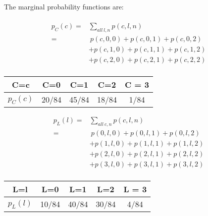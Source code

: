 \documentclass{article}
\begin{document}
The marginal probability functions are:\\
\\
\begin{equation} \label{eq1}
\begin{split}
p_C(c) = & \sum_{all\ l, n} p(c, l, n) \\
 = &\ p(c, 0, 0) + p(c,  0, 1) + p(c, 0, 2) \\
& + p(c, 1, 0) + p(c, 1, 1) + p(c, 1, 2) \\
& + p(c,  2, 0) + p(c, 2, 1) + p(c, 2, 2) \\
\end{split}
\end{equation}
\begin{center}
 \begin{tabular}{|| c c c c c ||} 
 \hline
C=c & C=0 & C=1 & C=2 & C = 3\\ [0.5ex] 
 \hline\hline
$p_C(c)$ & 20/84 & 45/84 & 18/84 & 1/84 \\ 
 \hline
\end{tabular}
\end{center}

\begin{equation} \label{eq2}
\begin{split}
p_L(l) = & \sum_{all\ c, n} p(c, l, n) \\
 = &\ p(0, l, 0) + p(0,  l, 1) + p(0, l, 2) \\
& + p(1, l, 0) + p(1, l, 1) + p(1, l, 2) \\
& + p(2, l, 0) + p(2, l, 1) + p(2, l, 2) \\
& + p(3, l, 0) + p(3, l, 1) + p(3, l, 2) \\
\end{split}
\end{equation}
\begin{center}
 \begin{tabular}{|| c c c c c ||} 
 \hline
L=l & L=0 & L=1 & L=2 & L = 3\\ [0.5ex] 
 \hline\hline
$p_L(l)$ & 10/84 & 40/84 & 30/84 & 4/84 \\ 
 \hline
\end{tabular}
\end{center}
\end{document}
